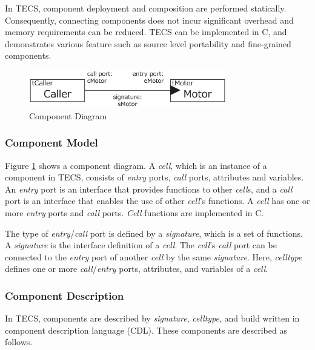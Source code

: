 \documentclass[conference]{IEEEtran/IEEEtran/IEEEtran}
\begin{document}
In TECS, component deployment and composition are performed statically.
Consequently, connecting components does not incur significant overhead and memory requirements can be reduced.
TECS can be implemented in C, and demonstrates various feature such as source level portability and fine-grained components.

\begin{figure}[b]
    \centering
    \includegraphics[width=8.6cm,clip]{figure/component_diagram.eps}
    \vspace{-2mm}
    \caption{Component Diagram}
    \vspace{-5mm}
    \label{fig:component}
\end{figure}

\subsubsection{Component Model}
Figure \ref{fig:component} shows a component diagram.
A {\it cell}, which is an instance of a component in TECS, consists of {\it entry} ports, {\it call} ports, attributes and variables.
An {\it entry} port is an interface that provides functions to other {\it cell}s, and a {\it call} port is an interface that enables the use of other {\it cell}'s functions.
A {\it cell} has one or more {\it entry} ports and {\it call} ports.
{\it Cell} functions are implemented in C.


The type of {\it entry}/{\it call} port is defined by a {\it signature}, which is a set of functions.
A {\it signature} is the interface definition of a {\it cell}.
The {\it cell}'s  {\it call} port can be connected to the {\it entry} port of another {\it cell} by the same {\it signature}.
Here, {\it celltype} defines one or more {\it call}/{\it entry} ports, attributes, and variables of a {\it cell}.


\subsubsection{Component Description}
In TECS, components are described by {\it signature}, {\it celltype}, and build written in component description language (CDL).
These components are described as follows.
\end{document}
